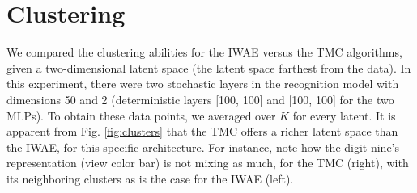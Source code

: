     \section{Clustering}
    \label{sec:clusters}
    We compared the clustering abilities for the IWAE versus the TMC algorithms, given a two-dimensional latent space (the latent space farthest from the data). In this experiment, there were two stochastic layers in the recognition model with dimensions 50 and 2 (deterministic layers [100, 100] and [100, 100] for the two MLPs). To obtain these data points, we averaged over $K$ for every latent. It is apparent from Fig. \ref{fig:clusters} that the TMC offers a richer latent space than the IWAE, for this specific architecture. For instance, note how the digit nine's representation (view color bar) is not mixing as much, for the TMC (right), with its neighboring clusters as is the case for the IWAE (left).

